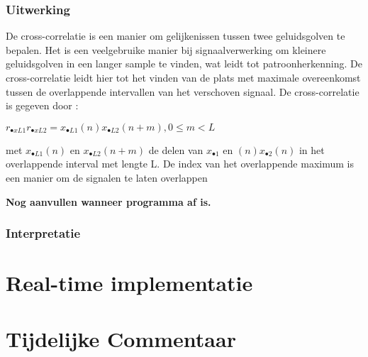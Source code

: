 \documentclass[12pt]{report}
\begin{document}
\subsection{Uitwerking}
De cross-correlatie is een manier om gelijkenissen tussen twee geluidsgolven te bepalen. Het is een veelgebruike manier bij signaalverwerking om kleinere geluidsgolven in een langer sample te vinden, wat leidt tot patroonherkenning. 
De cross-correlatie leidt hier tot het vinden van de plats met maximale overeenkomst tussen de  overlappende intervallen van het verschoven signaal. 
De cross-correlatie is gegeven door :
\begin{center}
$r_{•xL1}r_{•xL2}=x_{•L1}(n)x_{•L2}(n+m) ,0        \le m <L$
\end{center}
met $x_{•L1}(n)$ en $x_{•L2}(n+m)$ de delen van $x_{•1}$ en $(n)x_{•2}(n)$ in het overlappende interval met lengte L. De index van het overlappende maximum  is een manier om de signalen te laten overlappen


\textbf{Nog aanvullen wanneer programma af is.}

\subsection{Interpretatie}

\chapter{Real-time implementatie}

\chapter{Tijdelijke Commentaar}
\end{document}
